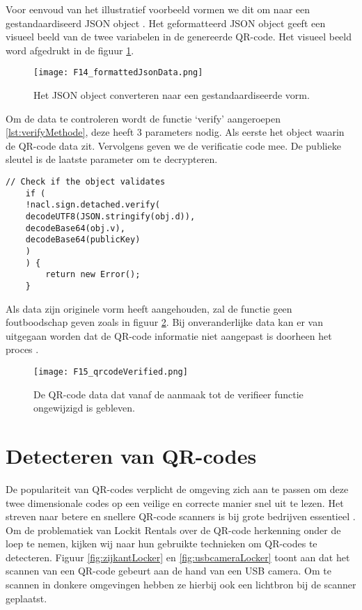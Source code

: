Voor eenvoud van het illustratief voorbeeld vormen we dit om naar een gestandaardiseerd \ac{JSON} object \autocite{Concept}. Het geformatteerd \ac{JSON} object geeft een visueel beeld van de twee variabelen in de genereerde QR-code. Het visueel beeld word afgedrukt in de figuur \ref{fig:formattedJsonData}.

\begin{figure}[h]
    \centering
    \texttt{[image: F14\_formattedJsonData.png]}
    \captionsetup{justification=centering, singlelinecheck=false}
    \caption{Het JSON object converteren naar een gestandaardiseerde vorm.}
    \label{fig:formattedJsonData}
\end{figure}

\newpage
Om de data te controleren wordt de functie ‘verify’ aangeroepen \ref{lst:verifyMethode}, deze heeft 3 parameters nodig. Als eerste het object waarin de QR-code data zit. Vervolgens geven we de verificatie code mee. De publieke sleutel is de laatste parameter om te decrypteren.


\begin{lstlisting}[caption={De controle van QR-code data met de TweetNaCL.js verifieer functie.}, label={lst:verifyMethode}]
    // Check if the object validates
    if (
    !nacl.sign.detached.verify(
    decodeUTF8(JSON.stringify(obj.d)),
    decodeBase64(obj.v),
    decodeBase64(publicKey)
    )
    ) {
        return new Error();
    }
\end{lstlisting}

Als data zijn originele vorm heeft aangehouden, zal de functie geen foutboodschap geven zoals in figuur \ref{fig:qrdataVerified}. Bij onveranderlijke data kan er van uitgegaan worden dat de QR-code informatie niet aangepast is doorheen het proces \autocite{Bernsteinb}. 

\begin{figure}[h]
    \centering
    \texttt{[image: F15\_qrcodeVerified.png]}
    \captionsetup{justification=centering, singlelinecheck=false}
    \caption{De QR-code data dat vanaf de aanmaak tot de verifieer  functie ongewijzigd is gebleven.}
    \label{fig:qrdataVerified}
\end{figure}

\newpage

\section{Detecteren van QR-codes}
\label{sec:detecterenQr-codes}

De populariteit van QR-codes verplicht de omgeving zich aan te passen om deze twee dimensionale codes op een veilige en correcte manier snel uit te lezen. Het streven naar betere en snellere QR-code scanners is bij grote bedrijven essentieel \autocite{Ertekin2015}.
Om de problematiek van Lockit Rentals over de QR-code herkenning onder de loep te nemen, kijken wij naar hun gebruikte technieken om QR-codes te detecteren. Figuur \ref{fig:zijkantLocker} en \ref{fig:usbcameraLocker} toont aan dat het scannen van een QR-code gebeurt aan de hand van een USB camera. Om te scannen in donkere omgevingen hebben ze hierbij ook een lichtbron bij de scanner geplaatst.

